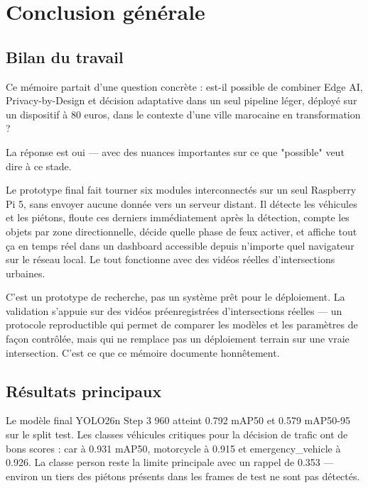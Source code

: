 \chapter{Conclusion générale}
\label{ch:conclusion}

\section*{Bilan du travail}
{}

Ce mémoire partait d'une question concrète :
est-il possible de combiner Edge AI,
Privacy-by-Design et décision adaptative
dans un seul pipeline léger, déployé sur
un dispositif à 80 euros, dans le contexte
d'une ville marocaine en transformation ?

La réponse est oui — avec des nuances
importantes sur ce que "possible" veut dire
à ce stade.

Le prototype final fait tourner six modules
interconnectés sur un seul Raspberry Pi 5,
sans envoyer aucune donnée vers un serveur
distant. Il détecte les véhicules et les
piétons, floute ces derniers immédiatement
après la détection, compte les objets par
zone directionnelle, décide quelle phase
de feux activer, et affiche tout ça en
temps réel dans un dashboard accessible
depuis n'importe quel navigateur sur le
réseau local. Le tout fonctionne avec des
vidéos réelles d'intersections urbaines.

C'est un prototype de recherche, pas un
système prêt pour le déploiement. La
validation s'appuie sur des vidéos
préenregistrées d'intersections réelles —
un protocole reproductible qui permet
de comparer les modèles et les paramètres
de façon contrôlée, mais qui ne remplace
pas un déploiement terrain sur une vraie
intersection. C'est ce que ce mémoire
documente honnêtement.

\section*{Résultats principaux}
{}

Le modèle final YOLO26n Step 3 960 atteint
0.792 mAP50 et 0.579 mAP50-95 sur le split
test. Les classes véhicules critiques pour
la décision de trafic ont de bons scores :
car à 0.931 mAP50, motorcycle à 0.915 et
emergency\_vehicle à 0.926. La classe person
reste la limite principale avec un rappel
de 0.353 — environ un tiers des piétons
présents dans les frames de test ne sont
pas détectés.

